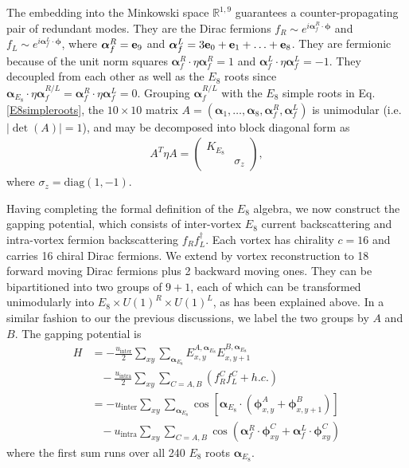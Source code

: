 The embedding into the Minkowski space $\mathbb{R}^{1,9}$ guarantees a counter-propagating pair of redundant modes. They are the Dirac fermions $f_R\sim e^{i\boldsymbol\alpha_f^R\cdot\boldsymbol\phi}$ and $f_L\sim e^{i\boldsymbol\alpha_f^L\cdot\boldsymbol\phi}$, where $\boldsymbol\alpha^R_f={\bf e}_9$ and $\boldsymbol\alpha^L_f=3{\bf e}_0+{\bf e}_1+\ldots+{\bf e}_8$. They are fermionic because of the unit norm squares $\boldsymbol\alpha^R_f\cdot\eta\boldsymbol\alpha^R_f=1$ and $\boldsymbol\alpha^L_f\cdot\eta\boldsymbol\alpha^L_f=-1$. They decoupled from each other as well as the $E_8$ roots since $\boldsymbol\alpha_{E_8}\cdot\eta\boldsymbol\alpha^{R/L}_f=\boldsymbol\alpha^R_f\cdot\eta\boldsymbol\alpha^L_f=0$. Grouping $\boldsymbol\alpha^{R/L}_f$ with the $E_8$ simple roots in Eq. \eqref{E8simpleroots}, the $10\times10$ matrix $A=(\boldsymbol\alpha_1,\ldots,\boldsymbol\alpha_8,\boldsymbol\alpha^R_f,\boldsymbol\alpha^L_f)$ is unimodular (i.e.~$|\det(A)|=1$), and may be decomposed into block diagonal form as \begin{align}A^T\eta A=\begin{pmatrix}K_{E_8}&\\&\sigma_z\end{pmatrix},\label{AAT}\end{align} where $\sigma_z=\mathrm{diag}(1,-1)$.

Having completing the formal definition of the $E_8$ algebra, we now construct the gapping potential, which consists of inter-vortex $E_8$ current backscattering and intra-vortex fermion backscattering $f_Rf_L^\dagger$. Each vortex has chirality $c=16$ and carries 16 chiral Dirac fermions. We extend by vortex reconstruction to 18 forward moving Dirac fermions plus 2 backward moving ones. They can be bipartitioned into two groups of $9+1$, each of which can be transformed unimodularly into $E_8\times U(1)^R\times U(1)^L$, as has been explained above. In a similar fashion to our the previous discussions, we label the two groups by $A$ and $B$. The gapping potential is \begin{align}H&=-\frac{u_{\mathrm{inter}}}{2}\sum_{xy}\sum_{\boldsymbol\alpha_{E_8}}E^{A,\boldsymbol\alpha_{E_8}}_{x,y}E^{B,\boldsymbol\alpha_{E_8}}_{x,y+1}\nonumber\\&\;\;\;-\frac{u_{\mathrm{intra}}}{2}\sum_{xy}\sum_{C=A,B}(f_R^Cf_L^C+h.c.)\nonumber\\&=-u_{\mathrm{inter}}\sum_{xy}\sum_{\boldsymbol\alpha_{E_8}}\cos\left[\boldsymbol\alpha_{E_8}\cdot(\boldsymbol\phi^A_{x,y}+\boldsymbol\phi^B_{x,y+1})\right]\nonumber\\&\;\;\;-u_{\mathrm{intra}}\sum_{xy}\sum_{C=A,B}\cos\left(\boldsymbol\alpha^R_f\cdot\boldsymbol\phi^C_{xy}+\boldsymbol\alpha^L_f\cdot\boldsymbol\phi^C_{xy}\right)\label{E8sinegordon}\end{align} where the first sum runs over all 240 $E_8$ roots $\boldsymbol\alpha_{E_8}$.

